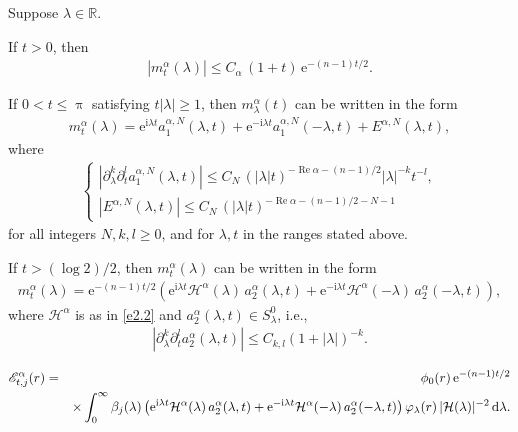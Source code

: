 \documentclass[10pt,a4paper]{amsart}
\newcommand{\CE}{\mathscr{E}}
\newcommand{\R}{\mathbb{R}}
\newcommand{\bc}{{ \mathcal{H} }}
\newcommand{\e}{\mathrm{e}}
\renewcommand{\Re}{\mathop{\mathrm{Re}}}
\renewcommand{\d}{\mathrm{d}}
\renewcommand{\i}{\mathrm{i}}
\begin{document}
\begin{lem}\label{lem:2.3}
Suppose $\lambda\in\R$.
\begin{asparaenum}[(i)]
\item If $t>0$, then
\begin{eqnarray*}
|m^\alpha_t(\lambda)|\leq C_\alpha \,(1+t)\,\e^{-(n-1) t/2}.
\end{eqnarray*}

\item If $0<t\leq \uppi$ satisfying $t|\lambda|\geq 1$, then $m^\alpha_\lambda(t)$ can be written in the form
\begin{eqnarray}\label{emmm}
m^\alpha_t(\lambda)=\e^{\i\lambda t}a^{\alpha,N}_1(\lambda,t)+\e^{-\i\lambda t}a^{\alpha,N}_1(-\lambda,t)+E^{\alpha,N}(\lambda,t),
\end{eqnarray}
where
\begin{eqnarray}\label{e2.601}
\begin{cases}
\displaystyle|{\partial^k_\lambda}{\partial^l_t}a^{\alpha,N}_1(\lambda,t)|\leq C_N\,(|\lambda|t)^{-\Re \alpha-(n-1)/2}|\lambda|^{-k}t^{-l},\\[4pt]
|E^{\alpha,N}(\lambda,t)|\leq C_N\,(|\lambda|t)^{-\Re\alpha-(n-1)/2-N-1} 
\end{cases}
\end{eqnarray}
for all integers $N, k, l\geq 0$, and for $\lambda, t$ in the ranges stated above.

\item If $t>(\log 2)/2$, then $m^\alpha_t(\lambda)$ can be written in the form
\begin{eqnarray*}
m^\alpha_t(\lambda)=\e^{-(n-1) t/2}\left(\e^{\i\lambda t}\bc^\alpha(\lambda)\,a^\alpha_2(\lambda,t)+\e^{-\i\lambda t}\bc^\alpha(-\lambda)\,a^\alpha_2(-\lambda,t)\right),
\end{eqnarray*}
where $\bc^\alpha$ is as in \eqref{e2.2} and $a^\alpha_2(\lambda,t)\in S^0_\lambda$, i.e.,
\begin{eqnarray*}
|\partial^k_\lambda\partial^l_t a^\alpha_2(\lambda,t)|\leq C_{k,l}(1+|\lambda|)^{-k}.
\end{eqnarray*}
\end{asparaenum}
\end{lem}

\begin{eqnarray}\label{e4.201}
\CE^\alpha_{t,j}(r)&=&
\phi_0(r)\,\e^{-(n-1)t/2}  \notag\\
&&\times\int_0^\infty \beta_j(\lambda)\left( \e^{\i\lambda t}\bc^\alpha(\lambda)\,a^\alpha_2(\lambda,t)+\e^{-\i\lambda t}\bc^\alpha(-\lambda)\,a^\alpha_2(-\lambda,t)\right)\varphi_\lambda(r)\,|\bc(\lambda)|^{-2}\,\d \lambda.
\end{eqnarray}
\end{document}
